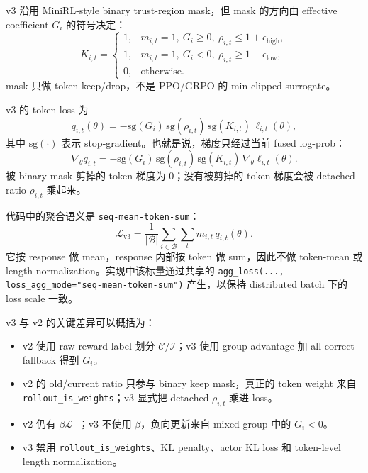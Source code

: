 v3 沿用 MiniRL-style binary trust-region mask，但 mask 的方向由 effective coefficient $G_i$ 的符号决定：
\begin{equation}
    K_{i,t}
    =
    \begin{cases}
        1,
        & m_{i,t}=1,\ G_i\ge 0,\ \rho_{i,t}\le 1+\epsilon_{\mathrm{high}},\\
        1,
        & m_{i,t}=1,\ G_i<0,\ \rho_{i,t}\ge 1-\epsilon_{\mathrm{low}},\\
        0,
        & \text{otherwise}.
    \end{cases}
    \label{eq:v3_keep_mask}
\end{equation}
mask 只做 token keep/drop，不是 PPO/GRPO 的 min-clipped surrogate。

v3 的 token loss 为
\begin{equation}
    q_{i,t}(\theta)
    =
    -\mathrm{sg}(G_i)\,
     \mathrm{sg}(\rho_{i,t})\,
     \mathrm{sg}(K_{i,t})\,
     \ell_{i,t}(\theta),
    \label{eq:v3_token_loss}
\end{equation}
其中 $\mathrm{sg}(\cdot)$ 表示 stop-gradient。也就是说，梯度只经过当前 fused log-prob：
\begin{equation}
    \nabla_\theta q_{i,t}
    =
    -\mathrm{sg}(G_i)\,
     \mathrm{sg}(\rho_{i,t})\,
     \mathrm{sg}(K_{i,t})\,
     \nabla_\theta \ell_{i,t}(\theta).
\end{equation}
被 binary mask 剪掉的 token 梯度为 $0$；没有被剪掉的 token 梯度会被 detached ratio $\rho_{i,t}$ 乘起来。

代码中的聚合语义是 \texttt{seq-mean-token-sum}：
\begin{equation}
    \mathcal{L}_{\mathrm{v3}}
    =
    \frac{1}{|\mathcal{B}|}
    \sum_{i\in\mathcal{B}}
    \sum_t
    m_{i,t}\,q_{i,t}(\theta).
    \label{eq:v3_total}
\end{equation}
它按 response 做 mean，response 内部按 token 做 sum，因此不做 token-mean 或 length normalization。实现中该标量通过共享的 \texttt{agg\_loss(..., loss\_agg\_mode="seq-mean-token-sum")} 产生，以保持 distributed batch 下的 loss scale 一致。

v3 与 v2 的关键差异可以概括为：
\begin{itemize}
    \item v2 使用 raw reward label 划分 $\mathcal{C}/\mathcal{I}$；v3 使用 group advantage 加 all-correct fallback 得到 $G_i$。
    \item v2 的 old/current ratio 只参与 binary keep mask，真正的 token weight 来自 \texttt{rollout\_is\_weights}；v3 显式把 detached $\rho_{i,t}$ 乘进 loss。
    \item v2 仍有 $\beta\mathcal{L}^{-}$；v3 不使用 $\beta$，负向更新来自 mixed group 中的 $G_i<0$。
    \item v3 禁用 \texttt{rollout\_is\_weights}、KL penalty、actor KL loss 和 token-level length normalization。
\end{itemize}

